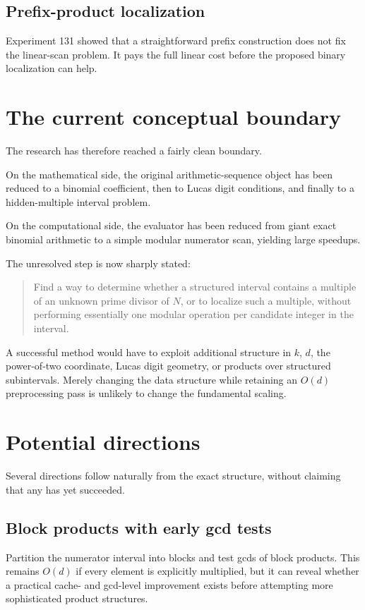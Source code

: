 \documentclass[11pt,a4paper]{article}
\begin{document}
\subsection{Prefix-product localization}
Experiment 131 showed that a straightforward prefix construction does not fix the linear-scan problem. It pays the full linear cost before the proposed binary localization can help.

\section{The current conceptual boundary}
\label{sec:boundary}

The research has therefore reached a fairly clean boundary.

On the mathematical side, the original arithmetic-sequence object has been reduced to a binomial coefficient, then to Lucas digit conditions, and finally to a hidden-multiple interval problem.

On the computational side, the evaluator has been reduced from giant exact binomial arithmetic to a simple modular numerator scan, yielding large speedups.

The unresolved step is now sharply stated:

\begin{quote}
Find a way to determine whether a structured interval contains a multiple of an unknown prime divisor of $N$, or to localize such a multiple, without performing essentially one modular operation per candidate integer in the interval.
\end{quote}

A successful method would have to exploit additional structure in $k$, $d$, the power-of-two coordinate, Lucas digit geometry, or products over structured subintervals. Merely changing the data structure while retaining an $O(d)$ preprocessing pass is unlikely to change the fundamental scaling.

\section{Potential directions}
\label{sec:future}

Several directions follow naturally from the exact structure, without claiming that any has yet succeeded.

\subsection{Block products with early gcd tests}
Partition the numerator interval into blocks and test gcds of block products. This remains $O(d)$ if every element is explicitly multiplied, but it can reveal whether a practical cache- and gcd-level improvement exists before attempting more sophisticated product structures.
\end{document}
